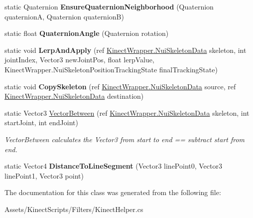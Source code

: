 \begin{DoxyCompactItemize}
static Quaternion {\bfseries Ensure\+Quaternion\+Neighborhood} (Quaternion quaternionA, Quaternion quaternionB)
\item 
\mbox{\label{class_kinect_helper_a3a634ac394a018cc8207634bf74e751e}} 
static float {\bfseries Quaternion\+Angle} (Quaternion rotation)
\item 
\mbox{\label{class_kinect_helper_aa5094dc4f70d1f067e23aaefa2280d5e}} 
static void {\bfseries Lerp\+And\+Apply} (ref \mbox{\hyperlink{struct_kinect_wrapper_1_1_nui_skeleton_data}{Kinect\+Wrapper.\+Nui\+Skeleton\+Data}} skeleton, int joint\+Index, Vector3 new\+Joint\+Pos, float lerp\+Value, Kinect\+Wrapper.\+Nui\+Skeleton\+Position\+Tracking\+State final\+Tracking\+State)
\item 
\mbox{\label{class_kinect_helper_a7c8b3dbeef069ec1f12f15d939598f59}} 
static void {\bfseries Copy\+Skeleton} (ref \mbox{\hyperlink{struct_kinect_wrapper_1_1_nui_skeleton_data}{Kinect\+Wrapper.\+Nui\+Skeleton\+Data}} source, ref \mbox{\hyperlink{struct_kinect_wrapper_1_1_nui_skeleton_data}{Kinect\+Wrapper.\+Nui\+Skeleton\+Data}} destination)
\item 
\mbox{\label{class_kinect_helper_adbd205f1683d864d65067ab28e6f33b9}} 
static Vector3 \mbox{\hyperlink{class_kinect_helper_adbd205f1683d864d65067ab28e6f33b9}{Vector\+Between}} (ref \mbox{\hyperlink{struct_kinect_wrapper_1_1_nui_skeleton_data}{Kinect\+Wrapper.\+Nui\+Skeleton\+Data}} skeleton, int start\+Joint, int end\+Joint)
\begin{DoxyCompactList}\small\item\em Vector\+Between calculates the Vector3 from start to end == subtract start from end. \end{DoxyCompactList}\item 
\mbox{\label{class_kinect_helper_a188d510eee3dd71b003ccdc95b308182}} 
static Vector4 {\bfseries Distance\+To\+Line\+Segment} (Vector3 line\+Point0, Vector3 line\+Point1, Vector3 point)
\end{DoxyCompactItemize}


The documentation for this class was generated from the following file\+:\begin{DoxyCompactItemize}
\item 
Assets/\+Kinect\+Scripts/\+Filters/Kinect\+Helper.\+cs\end{DoxyCompactItemize}
